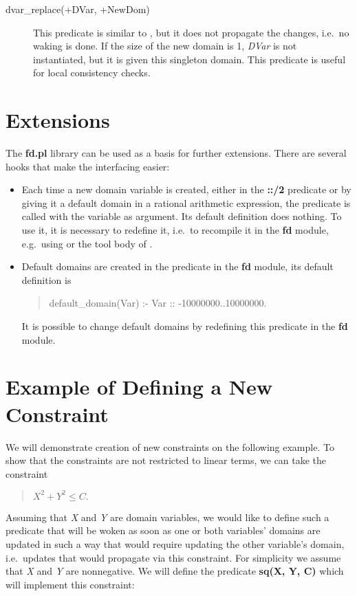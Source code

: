 \begin{description}
\item[dvar_replace(+DVar, +NewDom)]
This predicate is similar to , but it
does not propagate the changes, i.e.\ no waking is done.
If the size of the new domain is 1, {\it DVar}
is not instantiated, but it is given this singleton domain.
This predicate is useful for local consistency checks.

\end{description}

\section{Extensions}
The {\bf fd.pl} library can be used as a basis for further
extensions.
There are several hooks that make the interfacing easier:
\begin{itemize}
\item Each time a new domain variable is created, either
in the {\bf ::/2} predicate or by giving it a default domain
in a rational arithmetic expression, the predicate 
is called with the variable as argument.
Its default definition does nothing. To use it,
it is necessary to redefine it, i.e.\ to recompile it
in the {\bf fd} module, e.g.\ using 
or the tool body of .

\item Default domains
are created in the predicate 
in the {\bf fd} module, its default definition is

\begin{quote}
default_domain(Var) :- Var :: -10000000..10000000.
\end{quote}

It is possible to change default domains by redefining
this predicate in the {\bf fd} module.
\end{itemize}

\section{Example of Defining a New Constraint}
We will demonstrate creation of new constraints on the
following example.
To show that the constraints are not restricted to linear terms,
we can take the constraint
\begin{quote}
$X^2 + Y^2 \leq C.$
\end{quote}
Assuming that {\it X} and {\it Y} are domain variables, we would
like to define such a predicate that will be woken
as soon as one or both variables' domains are updated in such a way that would
require updating the other variable's domain, i.e.\ updates
that would propagate via this constraint.
For simplicity we assume that {\it X} and {\it Y} are nonnegative.
We will define the predicate {\bf sq(X, Y, C)} which will
implement this constraint:

